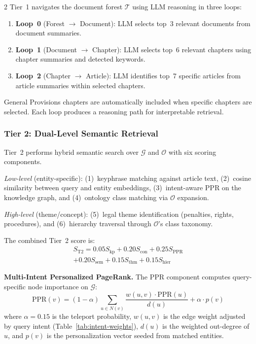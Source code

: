 \documentclass[11pt,a4paper]{article}
\begin{document}
\begin{multicols}{2}
Tier~1 navigates the document forest $\mathcal{T}$ using LLM reasoning in three loops:
\begin{enumerate}
\item \textbf{Loop~0} (Forest $\to$ Document): LLM selects top~3 relevant documents from document summaries.
\item \textbf{Loop~1} (Document $\to$ Chapter): LLM selects top~6 relevant chapters using chapter summaries and detected keywords.
\item \textbf{Loop~2} (Chapter $\to$ Article): LLM identifies top~7 specific articles from article summaries within selected chapters.
\end{enumerate}

General Provisions chapters are automatically included when specific chapters are selected. Each loop produces a reasoning path for interpretable retrieval.

\subsubsection{Tier 2: Dual-Level Semantic Retrieval}

Tier~2 performs hybrid semantic search over $\mathcal{G}$ and $\mathcal{O}$ with six scoring components.

\textit{Low-level} (entity-specific): (1)~keyphrase matching against article text, (2)~cosine similarity between query and entity embeddings, (3)~intent-aware PPR on the knowledge graph, and (4)~ontology class matching via $\mathcal{O}$ expansion.

\textit{High-level} (theme/concept): (5)~legal theme identification (penalties, rights, procedures), and (6)~hierarchy traversal through $\mathcal{O}$'s class taxonomy.

The combined Tier~2 score is:
\begin{multline}
S_{\text{T2}} = 0.05 S_{\text{kp}} + 0.20 S_{\text{con}} + 0.25 S_{\text{PPR}} \\
+ 0.20 S_{\text{sem}} + 0.15 S_{\text{thm}} + 0.15 S_{\text{hier}}
\end{multline}

\textbf{Multi-Intent Personalized PageRank.} The PPR component computes query-specific node importance on $\mathcal{G}$:
\begin{equation}
\text{PPR}(v) = (1-\alpha) \sum_{u \in N(v)} \frac{w(u,v) \cdot \text{PPR}(u)}{d(u)} + \alpha \cdot p(v)
\end{equation}
where $\alpha=0.15$ is the teleport probability, $w(u,v)$ is the edge weight adjusted by query intent (Table~\ref{tab:intent-weights}), $d(u)$ is the weighted out-degree of $u$, and $p(v)$ is the personalization vector seeded from matched entities.


\end{multicols}
\end{document}
